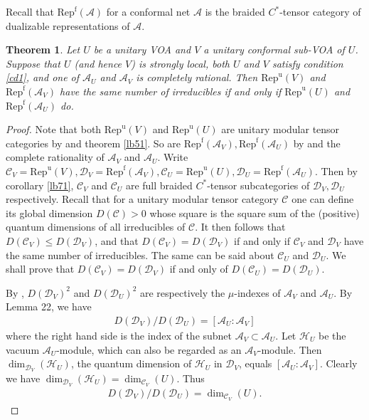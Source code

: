 \documentclass[12pt,a4paper]{article}
\theoremstyle{definition}
\theoremstyle{plain}
\newtheorem{thm}[df]{Theorem}
\newcommand{\mc}{\mathcal}
\newcommand{\Repu}{\mathrm{Rep}^{\mathrm u}}
\newcommand{\Repf}{\mathrm{Rep}^{\mathrm f}}
\newcommand{\RepuV}{\mathrm{Rep}^{\mathrm u}(V)}
\numberwithin{equation}{subsection}
\begin{document}
Recall that $\Repf(\mc A)$ for a conformal net $\mc A$ is the braided $C^*$-tensor category of dualizable representations of $\mc A$.

\begin{thm}\label{lb85}
	Let $U$ be a unitary VOA and $V$ a unitary conformal sub-VOA of $U$. Suppose that $U$ (and hence $V$) is strongly local,  both $U$ and $V$ satisfy condition \ref{cd1}, and one of $\mc A_U$ and $\mc A_V$ is completely rational. Then $\RepuV$ and $\Repf(\mc A_V)$ have the same number of irreducibles if and only if $\Repu(U)$ and $\Repf(\mc A_U)$ do.
\end{thm}


\begin{proof}
	Note that both $\Repu(V)$ and $\Repu(U)$ are unitary modular tensor categories by \cite{Hua08b} and theorem \ref{lb51}. So are $\Repf(\mc A_V),\Repf(\mc A_U)$ by \cite{KLM01} and the complete rationality of $\mc A_V$ and $\mc A_U$. Write $\mc C_V=\Repu(V),\mc D_V=\Repf(\mc A_V),\mc C_U=\Repu(U),\mc D_U=\Repf(\mc A_U)$. Then by corollary \ref{lb71}, $\mc C_V$ and $\mc C_U$ are full braided $C^*$-tensor subcategories of $\mc D_V,\mc D_U$ respectively. Recall that for a unitary modular tensor category $\mc C$ one can define its global dimension $D(\mc C)>0$ whose square is the square sum of the (positive) quantum dimensions of all irreducibles of $\mc C$. It then follows that $D(\mc C_V)\leq D(\mc D_V)$, and that $D(\mc C_V)=D(\mc D_V)$ if and only if $\mc C_V$ and $\mc D_V$ have the same number of irreducibles. The same can be said about $\mc C_U$ and $\mc D_U$. We shall prove that $D(\mc C_V)=D(\mc D_V)$ if and only of $D(\mc C_U)=D(\mc D_U)$.
	
	By \cite{KLM01}, $D(\mc D_V)^2$ and $D(\mc D_U)^2$ are respectively the $\mu$-indexes of $\mc A_V$ and $\mc A_U$. By \cite{Lon03} Lemma 22, we have
	\begin{align*}
	D(\mc D_V)/D(\mc D_U)=[\mc A_U:\mc A_V]
	\end{align*} 
	where the right hand side is the index of the subnet $\mc A_V\subset\mc A_U$. Let $\mc H_U$ be the vacuum $\mc A_U$-module, which can also be regarded as an $\mc A_V$-module. Then $\dim_{\mc D_V}(\mc H_U)$, the quantum dimension  of $\mc H_U$  in $\mc D_V$, equals $[\mc A_U:\mc A_V]$. Clearly we have $\dim_{\mc D_V}(\mc H_U)=\dim_{\mc C_V}(U)$. Thus
	\begin{align*}
	D(\mc D_V)/D(\mc D_U)=\dim_{\mc C_V}(U).
	\end{align*}
	

\end{proof}
\end{document}
